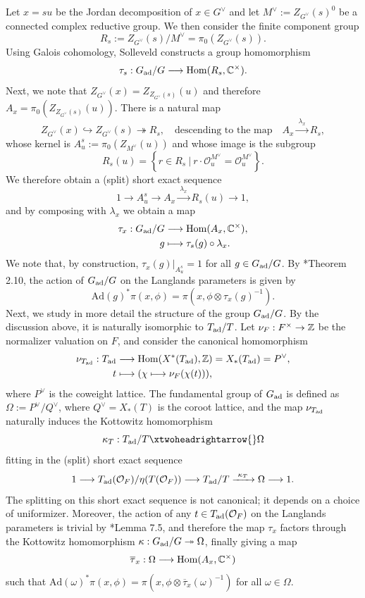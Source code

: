 Let $x=su$ be the Jordan decomposition of $x\in G^\vee$ and let $M^\vee:=Z_{G^\vee}(s)^0$ be a connected complex reductive group. We then consider the finite component group
$$R_s:=Z_{G^\vee}(s)/M^\vee=\pi_0(Z_{G^\vee}(s)).$$
Using Galois cohomology, Solleveld constructs a group homomorphism
$$\tau_{s}:G_{\mathrm{ad}}/G\longrightarrow\mathrm{Hom}(R_s,\mathbb{C}^\times).$$
Next, we note that $Z_{G^\vee}(x)=Z_{Z_{G^\vee}(s)}(u)$ and therefore $A_x=\pi_0(Z_{Z_{G^\vee}(s)}(u))$. There is a natural map 
$$Z_{G^\vee}(x)\hookrightarrow Z_{G^\vee}(s) \twoheadrightarrow R_s,\quad\text{descending to the map}\quad A_x\xrightarrow{\ \lambda_x\ } R_s,$$
whose kernel is $A^s_u:=\pi_0(Z_{M^\vee}(u))$ and whose image is the subgroup
$$R_s(u)=\left\{r\in R_s\ |\ r\cdot\mathcal{O}_u^{M^\vee}=\mathcal{O}_u^{M^\vee}\right\}.$$
We therefore obtain a (split) short exact sequence
$$1\longrightarrow A_u^s\longrightarrow A_x \xrightarrow{\ \lambda_x\ } R_s(u)\longrightarrow 1,$$
and by composing with $\lambda_x$ we obtain a map
\begin{align}
    \tau_x:G_{\mathrm{ad}}/G&\longrightarrow \mathrm{Hom}(A_x,\mathbb{C}^\times),\\
    g &\longmapsto \tau_s(g)\circ\lambda_x.\notag 
\end{align}
We note that, by construction, $\tau_x(g)|_{A^s_u}=1$ for all $g\in G_{\mathrm{ad}}/G$. By \cite{Solleveld2020}*{Theorem 2.10}, the action of $G_{\mathrm{ad}}/G$ on the Langlands parameters is given by
$$\mathrm{Ad}(g)^*\pi(x,\phi)=\pi(x,\phi\otimes\tau_x(g)^{-1}).$$
Next, we study in more detail the structure of the group $G_{\mathrm{ad}}/G$. By the discussion above, it is naturally isomorphic to $T_{\mathrm{ad}}/T$. Let $\nu_F:F^\times\to\mathbb{Z}$ be the normalizer valuation on $F$, and consider the canonical homomorphism
\begin{align*}
    \nu_{T_{\mathrm{ad}}}:T_{\mathrm{ad}}&\longrightarrow \mathrm{Hom}(X^*(T_{\mathrm{ad}}),\mathbb{Z})=X_*(T_{\mathrm{ad}})=P^\vee,\\
    t&\longmapsto (\chi\longmapsto\nu_F(\chi(t))),
\end{align*}
where $P^\vee$ is the coweight lattice. The fundamental group of $G_{\mathrm{ad}}$ is defined as $\Omega:=P^\vee/Q^\vee$, where $Q^\vee=X_*(T)$ is the coroot lattice, and the map $\nu_{T_{\mathrm{ad}}}$ naturally induces the Kottowitz homomorphism
$$\kappa_T:T_\ad/T \xtwoheadrightarrow{} \Omega$$
fitting in the (split) short exact sequence 
$$1\longrightarrow T_{\mathrm{ad}}(\mathcal{O}_F)/\eta(T(\mathcal{O}_F))\longrightarrow T_{\mathrm{ad}}/T\xrightarrow{\ \kappa_T\ }\Omega\longrightarrow 1.$$
The splitting on this short exact sequence is not canonical; it depends on a choice of uniformizer. Moreover, the action of any $t\in T_{\mathrm{ad}}(\mathcal{O}_F)$ on the Langlands parameters is trivial by \cite{Solleveld2020}*{Lemma 7.5}, and therefore the map $\tau_x$ factors through the Kottowitz homomorphism $\kappa:G_{\mathrm{ad}}/G\twoheadrightarrow\Omega$, finally giving a map
$$\overline{\tau}_x:\Omega\longrightarrow\mathrm{Hom}(A_x,\mathbb{C}^\times)$$
such that $\mathrm{Ad}(\omega)^*\pi(x,\phi)=\pi(x,\phi\otimes\overline{\tau}_x(\omega)^{-1})$ for all $\omega\in\Omega$. 

